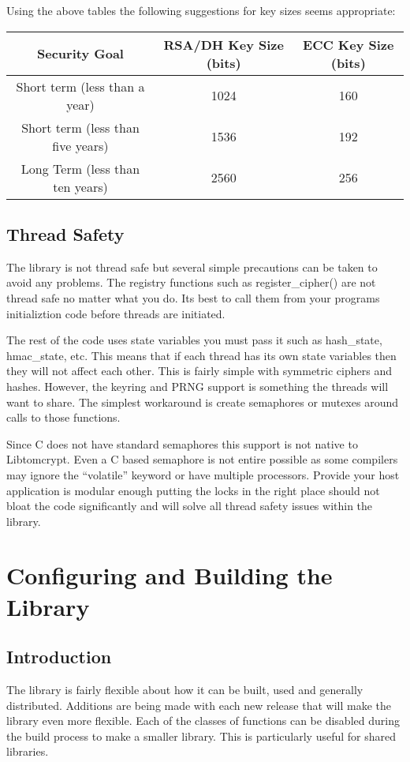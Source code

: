 \documentclass[a4paper]{book}
\begin{document}
Using the above tables the following suggestions for key sizes seems appropriate:
\begin{center}
\begin{tabular}{|c|c|c|}
    \hline Security Goal & RSA/DH Key Size (bits) & ECC Key Size (bits) \\
    \hline Short term (less than a year) & 1024 & 160 \\
    \hline Short term (less than five years) & 1536 & 192 \\
    \hline Long Term (less than ten years) & 2560 & 256 \\
    \hline 
\end{tabular}
\end{center}

\section{Thread Safety}
The library is not thread safe but several simple precautions can be taken to avoid any problems.  The registry functions
such as register\_cipher() are not thread safe no matter what you do.  Its best to call them from your programs initializtion
code before threads are initiated.

The rest of the code uses state variables you must pass it such as hash\_state, hmac\_state, etc.  This means that if each
thread has its own state variables then they will not affect each other.  This is fairly simple with symmetric ciphers
and hashes.  However, the keyring and PRNG support is something the threads will want to share.  The simplest workaround 
is create semaphores or mutexes around calls to those functions.  

Since C does not have standard semaphores this support is not native to Libtomcrypt.  Even a C based semaphore is not entire
possible as some compilers may ignore the ``volatile'' keyword or have multiple processors.  Provide your host application
is modular enough putting the locks in the right place should not bloat the code significantly and will solve all thread
safety issues within the library.

\chapter{Configuring and Building the Library}
\section{Introduction}
The library is fairly flexible about how it can be built, used and generally distributed.  Additions are being made with
each new release that will make the library even more flexible.  Each of the classes of functions can be disabled during
the build process to make a smaller library.  This is particularly useful for shared libraries.
\end{document}
